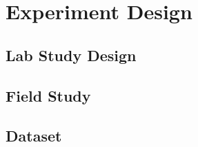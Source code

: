 \section{Experiment Design}

\subsection{Lab Study Design}

\subsection{Field Study}

\subsection{Dataset}


\cleardoublepage